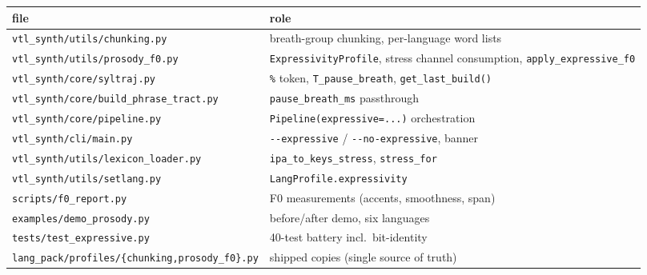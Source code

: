 \documentclass[11pt,a4paper]{article}
\newcommand{\ks}[1]{\texttt{#1}}
\begin{document}
\begin{center}
\begin{tabularx}{\textwidth}{lX}
\toprule
\textbf{file} & \textbf{role} \\
\midrule
\texttt{vtl\_synth/utils/chunking.py} & breath-group chunking, per-language word lists \\
\texttt{vtl\_synth/utils/prosody\_f0.py} & \texttt{ExpressivityProfile}, stress channel consumption, \texttt{apply\_expressive\_f0} \\
\texttt{vtl\_synth/core/syltraj.py} & \ks{\%} token, \texttt{T\_pause\_breath}, \texttt{get\_last\_build()} \\
\texttt{vtl\_synth/core/build\_phrase\_tract.py} & \texttt{pause\_breath\_ms} passthrough \\
\texttt{vtl\_synth/core/pipeline.py} & \texttt{Pipeline(expressive=...)} orchestration \\
\texttt{vtl\_synth/cli/main.py} & \texttt{-{}-expressive} / \texttt{-{}-no-expressive}, banner \\
\texttt{vtl\_synth/utils/lexicon\_loader.py} & \texttt{ipa\_to\_keys\_stress}, \texttt{stress\_for} \\
\texttt{vtl\_synth/utils/setlang.py} & \texttt{LangProfile.expressivity} \\
\texttt{scripts/f0\_report.py} & F0 measurements (accents, smoothness, span) \\
\texttt{examples/demo\_prosody.py} & before/after demo, six languages \\
\texttt{tests/test\_expressive.py} & 40-test battery incl.\ bit-identity \\
\texttt{lang\_pack/profiles/\{chunking,prosody\_f0\}.py} & shipped copies (single source of truth) \\
\bottomrule
\end{tabularx}
\end{center}
\end{document}
